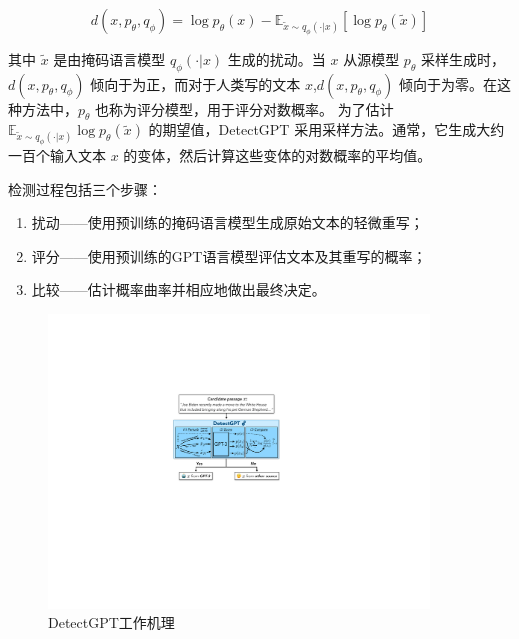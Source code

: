 \documentclass[a4paper]{report}
\begin{document}
\[ d(x,p_{\theta}, q_{\phi}) = \log p_{\theta}(x) - \mathbb{E}_{\tilde{x} \sim q_{\phi}(\cdot|x)} [\log p_{\theta}(\tilde{x})]\]

其中 \(\tilde{x}\) 是由掩码语言模型 \(q_{\phi}(\cdot|x)\) 生成的扰动。当 \(x\) 从源模型 \(p_{\theta}\) 采样生成时，\(d(x,p_{\theta}, q_{\phi})\) 倾向于为正，而对于人类写的文本 \(x\),\(d(x, p_{\theta},q_{\phi})\) 倾向于为零。在这种方法中，\(p_{\theta}\) 也称为评分模型，用于评分对数概率。
为了估计 \(\mathbb{E}_{\tilde{x} \sim q_{\phi}(\cdot|x)} \log p_{\theta}(\tilde{x})\) 的期望值，DetectGPT 采用采样方法。通常，它生成大约一百个输入文本 \(x\) 的变体，然后计算这些变体的对数概率的平均值。

检测过程包括三个步骤：
\begin{enumerate}
	\item 扰动——使用预训练的掩码语言模型生成原始文本的轻微重写；
	\item 评分——使用预训练的GPT语言模型评估文本及其重写的概率；
	\item 比较——估计概率曲率并相应地做出最终决定\cite{mitchell2023detectgpt}。
\end{enumerate}

\begin{figure}[H]
	\centering
	\includegraphics[width=0.9\textwidth]{figures/DetctGPT_流程.pdf}
	\caption{DetectGPT工作机理}
	\label{DetectGPT}
\end{figure}
\end{document}
